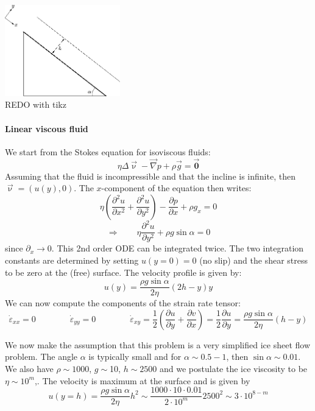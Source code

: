 


\begin{center}
\includegraphics[width=5cm]{python_codes/fieldstone_59/images/setup}\\
{\captionfont REDO with tikz}
\end{center}

\paragraph{Linear viscous fluid}

We start from the Stokes equation for isoviscous fluids:
\[
\eta \Delta \vec{\upnu} - \vec\nabla p + \rho \vec{g} = \vec{\bm 0}
\]
Assuming that the fluid is incompressible and that the incline is infinite, 
then $\vec{\upnu}=(u(y),0)$.
The $x$-component of the equation then writes:
\[
\eta\left(\frac{\partial^2 u}{\partial x^2}+\frac{\partial^2 u}{\partial y^2} \right)
- \frac{\partial p}{\partial x} + \rho g_x =0
\]
\[
\Rightarrow \qquad 
\eta\frac{\partial^2 u}{\partial y^2} 
+ \rho g \sin\alpha =0
\]
since $\partial_x\rightarrow 0$.
This 2nd order ODE can be integrated twice. The two integration constants are 
determined by setting $u(y=0)=0$ (no slip) and the shear stress to be zero at the (free)
surface. The velocity profile is given by:
\[
u(y)=\frac{\rho g \sin \alpha}{2 \eta} (2h-y)y
\]
We can now compute the components of the strain rate tensor:
\[
\dot{\varepsilon}_{xx}=0
\qquad
\qquad
\dot{\varepsilon}_{yy}=0
\qquad
\qquad
\dot{\varepsilon}_{xy}
=\frac{1}{2} \left( \frac{\partial u}{\partial y} + \frac{\partial v}{\partial x} \right)
=\frac{1}{2} \frac{\partial u}{\partial y} 
= \frac{\rho g \sin \alpha}{2 \eta} (h-y)
\]

We now make the assumption that this problem is a very simplified ice sheet flow problem.
The angle $\alpha$ is typically small and for $\alpha\sim 0.5-1$\degree, then $\sin\alpha\sim 0.01$. 
We also have $\rho\sim1000$, $g\sim$10,  $h\sim2500$ and we postulate the 
ice viscosity to be $\eta\sim 10^m$,.
The velocity is maximum at the surface and is given by
\begin{equation}
u(y=h)=
\frac{\rho g \sin \alpha}{2 \eta}h^2 
\sim \frac{1000 \cdot 10 \cdot 0.01}{ 2\cdot 10^m}2500^2
\sim 3\cdot 10^{8-m}
\label{eq:ice1}
\end{equation}

